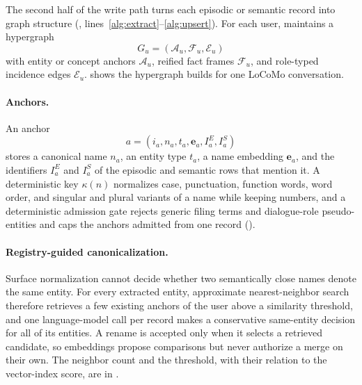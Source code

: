 The second half of the write path turns each episodic or semantic record into
graph structure (, lines~\ref{alg:extract}--\ref{alg:upsert}).
For each user, \method maintains a hypergraph
\begin{equation}
    G_u=(\mathcal A_u,\mathcal F_u,\mathcal E_u)
\end{equation}
with entity or concept anchors \(\mathcal A_u\), reified fact frames
\(\mathcal F_u\), and role-typed incidence edges \(\mathcal E_u\).
 shows the hypergraph \method builds for one LoCoMo conversation.

\paragraph{Anchors.}
An anchor
\begin{equation}
    a=(i_a,n_a,t_a,\mathbf e_a,I_a^E,I_a^S)
\end{equation}
stores a canonical name \(n_a\), an entity type \(t_a\), a name embedding
\(\mathbf e_a\), and the identifiers \(I_a^E\) and \(I_a^S\) of the episodic and
semantic rows that mention it. A deterministic key \(\kappa(n)\) normalizes
case, punctuation, function words, word order, and singular and plural variants
of a name while keeping numbers, and a deterministic admission gate rejects
generic filing terms and dialogue-role pseudo-entities and caps the anchors
admitted from one record ().

\paragraph{Registry-guided canonicalization.}
Surface normalization cannot decide whether two semantically close names denote
the same entity. For every extracted entity, approximate nearest-neighbor search
therefore retrieves a few existing anchors of the user above a similarity
threshold, and one language-model call per record makes a conservative
same-entity decision for all of its entities. A rename is accepted only when it
selects a retrieved candidate, so embeddings propose comparisons but never
authorize a merge on their own. The neighbor count and the threshold, with their relation to the vector-index score, are in .

